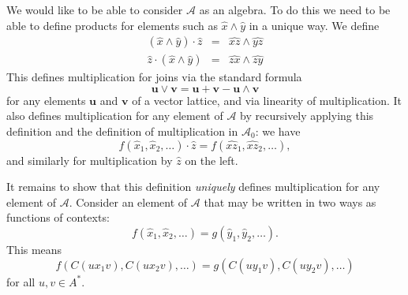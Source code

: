 \documentclass[11pt]{report}
\begin{document}
We would like to be able to consider $\mathcal{A}$ as an algebra. To do this we need to be able to define products for elements such as $\hat{x} \land \hat{y}$ in a unique way. We define
\begin{eqnarray*}
(\hat{x} \land \hat{y})\cdot \hat{z} &=& \widehat{xz} \land \widehat{yz}\\
\hat{z}\cdot (\hat{x} \land \hat{y}) &=& \widehat{zx} \land \widehat{zy}
\end{eqnarray*}
This defines multiplication for joins via the standard formula
$$\mathbf{u} \lor \mathbf{v} = \mathbf{u} + \mathbf{v} - \mathbf{u} \land \mathbf{v}$$
for any elements $\mathbf{u}$ and $\mathbf{v}$ of a vector lattice, and via linearity of multiplication. It also defines multiplication for any element of $\mathcal{A}$ by recursively applying this definition and the definition of multiplication in $\mathcal{A}_0$: we have
$$f(\hat{x}_1,\hat{x}_2,\ldots)\cdot \hat{z} = f(\widehat{xz}_1,\widehat{xz}_2,\ldots),$$
and similarly for multiplication by $\hat{z}$ on the left.

It remains to show that this definition \emph{uniquely} defines multiplication for any element of $\mathcal{A}$. Consider an element of $\mathcal{A}$ that may be written in two ways as functions of contexts:
$$f(\hat{x}_1, \hat{x}_2,\ldots) = g(\hat{y}_1,\hat{y}_2,\ldots).$$
This means
$$f(C(ux_1v),C(ux_2v),\ldots) = g(C(uy_1v),C(uy_2v),\ldots)$$
for all $u,v \in A^*$.



\end{document}
